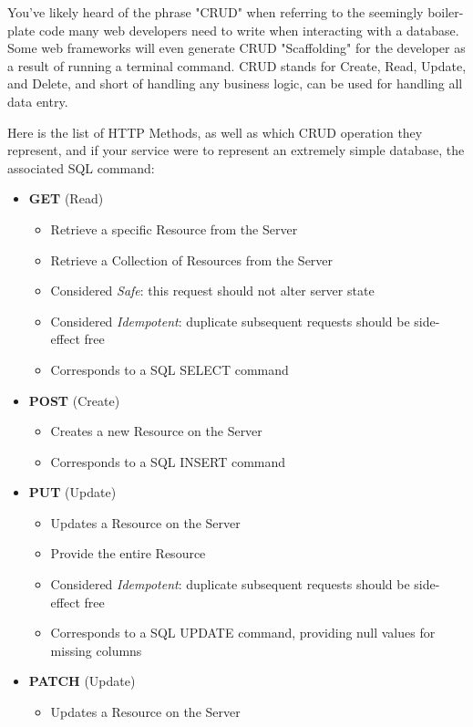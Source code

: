 \documentclass{book}
\begin{document}
You've likely heard of the phrase "CRUD" when referring to the seemingly boiler-plate code many web developers need to write when interacting with a database. Some web frameworks will even generate CRUD "Scaffolding" for the developer as a result of running a terminal command. CRUD stands for Create, Read, Update, and Delete, and short of handling any business logic, can be used for handling all data entry.

Here is the list of HTTP Methods, as well as which CRUD operation they represent, and if your service were to represent an extremely simple database, the associated SQL command:

\begin{itemize}
\item \textbf{GET} (Read)
    \begin{itemize}
    \item Retrieve a specific Resource from the Server
    \item Retrieve a Collection of Resources from the Server
    \item Considered \emph{Safe}: this request should not alter server state
    \item Considered \emph{Idempotent}: duplicate subsequent requests should be side-effect free
    \item Corresponds to a SQL SELECT command
    \end{itemize}
\item \textbf{POST} (Create)
    \begin{itemize}
    \item Creates a new Resource on the Server
    \item Corresponds to a SQL INSERT command
    \end{itemize}
\item \textbf{PUT} (Update)
    \begin{itemize}
    \item Updates a Resource on the Server
    \item Provide the entire Resource
    \item Considered \emph{Idempotent}: duplicate subsequent requests should be side-effect free
    \item Corresponds to a SQL UPDATE command, providing null values for missing columns
    \end{itemize}
\item \textbf{PATCH} (Update)
    \begin{itemize}
    \item Updates a Resource on the Server

\end{itemize}
\end{itemize}
\end{document}
